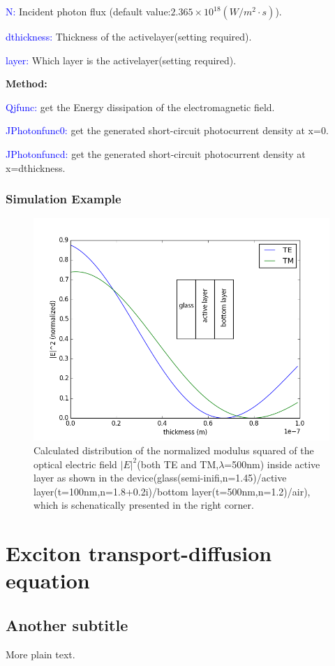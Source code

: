 \documentclass{article}
\begin{document}
\textcolor{blue}{N:} Incident photon flux (default value:$2.365\times
{{10}^{18}}(W/{{m}^{2}}\cdot s)$).

\textcolor{blue}{dthickness:} Thickness of the activelayer(setting required).

\textcolor{blue}{layer:} Which layer is the activelayer(setting required).

\textbf{Method:}

\textcolor{blue}{Qjfunc:} get the Energy dissipation of the electromagnetic
field.

\textcolor{blue}{JPhotonfunc0:} get the generated short-circuit photocurrent
density at x=0.

\textcolor{blue}{JPhotonfuncd:} get the generated short-circuit photocurrent
density at x=dthickness.




\subsubsection{Simulation Example}
\begin{figure}[h!]
  \centering
    \includegraphics[width=1\textwidth]{electricfield}
  \caption{Calculated distribution of the normalized modulus squared of the
  optical electric field ${{\left| E \right|}^{2}}$(both TE and
  TM,$\lambda$=500nm) inside active layer as shown in the
  device(glass(semi-inifi,n=1.45)/active layer(t=100nm,n=1.8+0.2i)/bottom
  layer(t=500nm,n=1.2)/air), which is schenatically presented in the right
  corner.
  }
  \label{electricfield}
\end{figure}





\section{Exciton transport-diffusion equation
}

\subsection{Another subtitle}
More plain text.

{}

\end{document}
